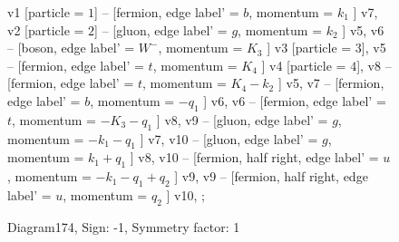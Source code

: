 \documentclass{revtex4}
\begin{document}
\begin{figure}[!htb]
\begin{center}
{    %
v1 [particle = \(1\)] -- [fermion, edge label' = \(b\), momentum = \(k_{1}\) ] v7, 
v2 [particle = \(2\)] -- [gluon, edge label' = \(g\), momentum = \(k_{2}\) ] v5, 
v6 -- [boson, edge label' = \(W^{-}\), momentum = \(K_{3}\) ] v3 [particle = \(3\)], 
v5 -- [fermion, edge label' = \(t\), momentum = \(K_{4}\) ] v4 [particle = \(4\)], 
v8 -- [fermion, edge label' = \(t\), momentum = \(K_{4} - k_{2}\) ] v5, 
v7 -- [fermion, edge label' = \(b\), momentum = \(-q_{1}\) ] v6, 
v6 -- [fermion, edge label' = \(t\), momentum = \(-K_{3} - q_{1}\) ] v8, 
v9 -- [gluon, edge label' = \(g\), momentum = \(-k_{1} - q_{1}\) ] v7, 
v10 -- [gluon, edge label' = \(g\), momentum = \(k_{1} + q_{1}\) ] v8, 
v10 -- [fermion, half right, edge label' = \(u\), momentum = \(-k_{1} - q_{1} + q_{2}\) ] v9, 
v9 -- [fermion, half right, edge label' = \(u\), momentum = \(q_{2}\) ] v10, 
};
\end{center}
\caption{Diagram174, Sign: -1, Symmetry factor: 1}
\end{figure}
\newpage
\end{document}
